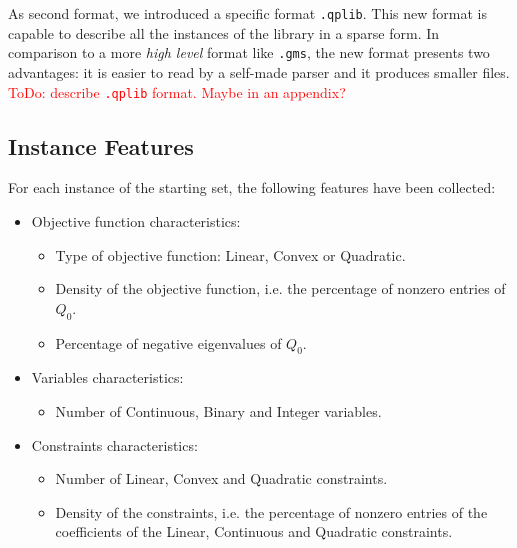 As second format, we introduced 
a specific format \texttt{.qplib}. This new format is capable to describe all the instances of the library in a sparse form. 
In comparison to a more \emph{high level} format like \texttt{.gms}, the new format presents two advantages:  
it is easier to read by a self-made parser and it produces smaller files.
\textcolor{red}{ToDo: describe \texttt{.qplib} format. Maybe in an appendix?}  





\subsection{Instance Features}\label{subsec:feature}

%

For each instance of the starting set, the following features have been collected:
\begin{itemize}
\item Objective function characteristics:
\begin{itemize}
\item Type of objective function:  Linear, Convex or Quadratic.
\item Density of the objective function, i.e. the percentage of nonzero entries of $Q_0$. 
\item Percentage of negative eigenvalues of $Q_0$.  
\end{itemize}
\item Variables characteristics:
\begin{itemize}
\item Number of Continuous, Binary and Integer variables.
\end{itemize}
\item Constraints characteristics:
\begin{itemize}
\item Number of Linear, Convex and Quadratic constraints.
\item Density of the constraints, i.e. the percentage of nonzero entries of the coefficients of the Linear, Continuous and Quadratic constraints. 
\end{itemize}
\end{itemize}

